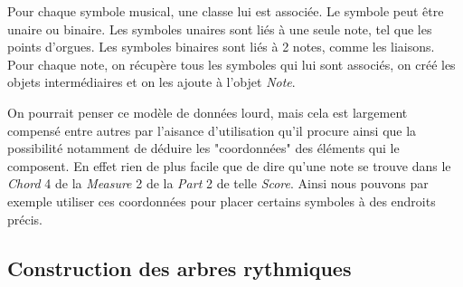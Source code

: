 \par
Pour chaque symbole musical, une classe lui est associée. Le symbole peut être unaire ou binaire.
Les symboles unaires sont liés à une seule note, tel que les points d'orgues. Les symboles binaires
sont liés à 2 notes, comme les liaisons. Pour chaque note, on récupère tous les symboles qui lui 
sont associés, on créé les objets intermédiaires et on les ajoute à l'objet \emph{Note}.


\par
On pourrait penser ce modèle de données lourd, mais cela est largement compensé entre autres
par l'aisance d'utilisation qu'il procure ainsi que la possibilité notamment de déduire les
"coordonnées" des éléments qui le composent. En effet rien de plus facile que de dire
qu'une note se trouve dans le \emph{Chord} 4 de la \emph{Measure} 2 de la \emph{Part}
2 de telle \emph{Score}. Ainsi nous pouvons par exemple utiliser ces coordonnées pour
placer certains symboles à des endroits précis.

\subsection{Construction des arbres rythmiques}

